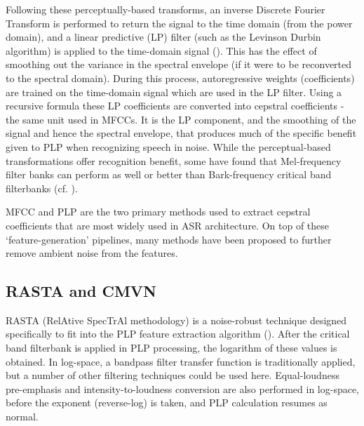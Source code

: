 Following these perceptually-based transforms, an inverse Discrete Fourier Transform is performed to return the signal to the time domain (from the power domain), and a linear predictive (LP) filter (such as the Levinson Durbin algorithm) is applied to the time-domain signal (\cite{gold:11}).  This has the effect of smoothing out the variance in the spectral envelope (if it were to be reconverted to the spectral domain).  During this process, autoregressive weights (coefficients) are trained on the time-domain signal which are used in the LP filter.  Using a recursive formula these LP coefficients are converted into cepstral coefficients - the same unit used in MFCCs.  It is the LP component, and the smoothing of the signal and hence the spectral envelope, that produces much of the specific benefit given to PLP when recognizing speech in noise.  While the perceptual-based transformations offer recognition benefit, some have found that Mel-frequency filter banks can perform as well or better than Bark-frequency critical band filterbanks (cf. \cite{honig:05}).

MFCC and PLP are the two primary methods used to extract cepstral coefficients that are most widely used in ASR architecture.  On top of these `feature-generation' pipelines, many methods have been proposed to further remove ambient noise from the features.

\DIFdelbegin \subsubsection{}%
\addtocounter{subsubsection}{-1}%
\DIFdelend \DIFaddbegin \subsection{RASTA and CMVN}\DIFaddend \label{sec:rasta_cmvn}

RASTA (RelAtive SpecTrAl methodology) is a noise-robust technique designed specifically to fit into the PLP feature extraction algorithm (\cite{hermansky:92}).  After the critical band filterbank is applied in PLP processing, the logarithm of these values is obtained.  In log-space, a bandpass filter transfer function is traditionally applied, but a number of other filtering techniques could be used here.  Equal-loudness pre-emphasis and intensity-to-loudness conversion are also performed in log-space, before the exponent (reverse-log) is taken, and PLP calculation resumes as normal.

